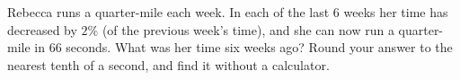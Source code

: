 Rebecca runs a quarter-mile each week. In each of the last $6$ weeks her time has decreased by $2\%$ (of the previous week's time), and she can now run a quarter-mile in $66$ seconds. What was her time six weeks ago? Round your answer to the nearest tenth of a second, and find it without a calculator.
